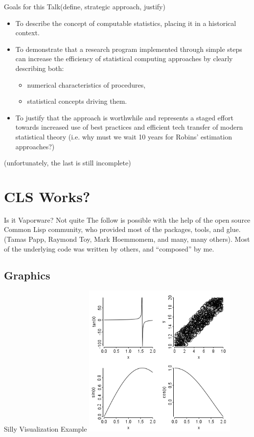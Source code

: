 \documentclass{beamer}
\begin{document}
\begin{frame}{Goals for this Talk}{(define, strategic approach,
    justify)}

  \begin{itemize}
  \item To describe the concept of \alert{computable statistics},
    placing it in a historical context.

  \item To demonstrate that \alert{a research program}
    implemented through  simple steps can increase the efficiency  of
    statistical computing approaches by  clearly describing both:
    \begin{itemize}
    \item numerical characteristics of procedures,
    \item statistical concepts driving them.
    \end{itemize}

  \item To justify that the \alert{approach is worthwhile} and
    represents a staged effort towards \alert{increased use of best
      practices} and efficient tech transfer of modern statistical
    theory (i.e. why must we wait 10 years for Robins' estimation
    approaches?)
  \end{itemize}
  (unfortunately, the last is still incomplete)
\end{frame}

\section{CLS Works?}
\label{sec:work}

\begin{frame}{Is it Vaporware? Not quite}
  The follow is possible with the help of the open source Common Lisp
  community, who provided most of the packages, tools, and glue.
  (Tamas Papp, Raymond Toy, Mark Hoemmomem, and many, many others).
  Most of the underlying code was written by others, and ``composed''
  by me.
\end{frame}

\subsection{Graphics}
\label{sec:work:graphics}

\begin{frame}{Silly Visualization Example}
  \includegraphics[width=3in,height=3in]{./test1.png}
\end{frame}
\end{document}
